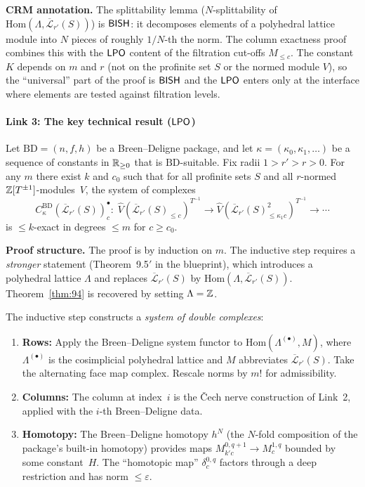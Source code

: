 \medskip
\noindent\textbf{CRM annotation.}
The splittability lemma ($N$-splittability of $\mathrm{Hom}(\Lambda,
\overline{\mathcal{L}}_{r'}(S))$) is $\textsf{BISH}$: it decomposes elements
of a polyhedral lattice module into $N$ pieces of roughly $1/N$-th
the norm.  The column exactness proof combines this with the $\textsf{LPO}$
content of the filtration cut-offs $M_{\leq c}$.  The constant~$K$
depends on $m$ and $r$ (not on the profinite set $S$ or the normed
module $V$), so the ``universal'' part of the proof is $\textsf{BISH}$ and
the $\textsf{LPO}$ enters only at the interface where elements are tested
against filtration levels.

\paragraph{Link 3: The key technical result ($\textsf{LPO}$)}

\begin{theorem}
\label{thm:94}
Let $\mathrm{BD} = (n, f, h)$ be a Breen--Deligne package, and let
$\kappa = (\kappa_0, \kappa_1, \ldots)$ be a sequence of constants
in $\mathbb{R}_{\geq 0}$ that is $\mathrm{BD}$-suitable.  Fix radii
$1 > r' > r > 0$.  For any $m$ there exist $k$ and $c_0$ such that
for all profinite sets $S$ and all $r$-normed
$\mathbb{Z}[T^{\pm 1}]$-modules~$V$, the system of complexes
\[
  C^{\mathrm{BD}}_\kappa(\overline{\mathcal{L}}_{r'}(S))^\bullet_c
  \colon \;
  \widehat{V}(\overline{\mathcal{L}}_{r'}(S)_{\leq c})^{T^{-1}}
  \longrightarrow
  \widehat{V}(\overline{\mathcal{L}}_{r'}(S)_{\leq \kappa_1 c}^2)^{T^{-1}}
  \longrightarrow \cdots
\]
is $\leq k$-exact in degrees $\leq m$ for $c \geq c_0$.
\end{theorem}

\noindent\textbf{Proof structure.}
The proof is by induction on $m$.  The inductive step requires a
\emph{stronger} statement (Theorem~9.5$'$ in the blueprint), which
introduces a polyhedral lattice $\Lambda$ and replaces
$\overline{\mathcal{L}}_{r'}(S)$ by
$\mathrm{Hom}(\Lambda, \overline{\mathcal{L}}_{r'}(S))$.
Theorem~\ref{thm:94} is recovered by setting $\Lambda = \mathbb{Z}$.

The inductive step constructs a \emph{system of double complexes}:
\begin{enumerate}[nosep]
\item \textbf{Rows:} Apply the Breen--Deligne system functor to
  $\mathrm{Hom}(\Lambda^{(\bullet)}, M)$, where $\Lambda^{(\bullet)}$
  is the cosimplicial polyhedral lattice and $M$ abbreviates
  $\overline{\mathcal{L}}_{r'}(S)$.  Take the alternating face map
  complex.  Rescale norms by $m!$ for admissibility.
\item \textbf{Columns:} The column at index~$i$ is the Čech nerve
  construction of Link~2, applied with the $i$-th Breen--Deligne data.
\item \textbf{Homotopy:} The Breen--Deligne homotopy $h^N$ (the
  $N$-fold composition of the package's built-in homotopy) provides
  maps $M^{0,q+1}_{k'c} \to M^{1,q}_c$ bounded by some constant~$H$.
  The ``homotopic map'' $\delta^{0,q}_c$ factors through a deep
  restriction and has norm $\leq \varepsilon$.
\end{enumerate}

